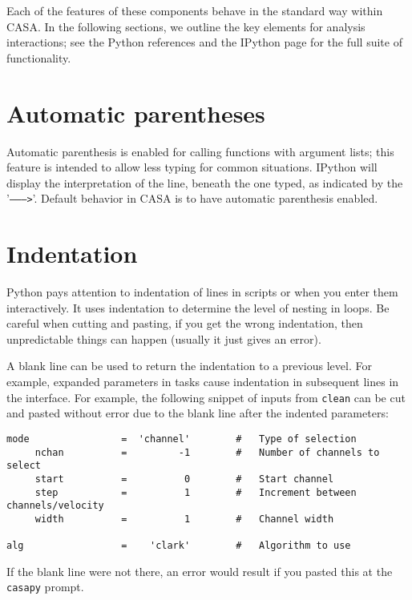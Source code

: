 Each of the features of these components behave in the standard way
within CASA. In the following sections, we outline the key elements
for analysis interactions; see the Python references and the
IPython page for the full suite of functionality.

\section{Automatic parentheses}
\label{section:python.par}

Automatic parenthesis is enabled for calling functions with argument
lists; this feature is intended to allow less typing for common
situations. IPython will display the interpretation of the line,
beneath the one typed, as indicated by the '{\tt -------->}'. Default
behavior in CASA is to have automatic parenthesis enabled. 

\section{Indentation}
\label{section:python.indent}

Python pays attention to indentation of lines in scripts or when you
enter them interactively.  It uses indentation to determine the level
of nesting in loops.  Be careful when cutting and pasting, if you
get the wrong indentation, then unpredictable things can happen
(usually it just gives an error).  

A blank line can be used to return the indentation to a previous
level.  For example, expanded parameters in tasks cause indentation
in subsequent lines in the interface.  For example, the following
snippet of inputs from {\tt clean} can be cut and pasted without 
error due to the blank line after the indented parameters:
\small
\begin{verbatim}
mode                =  'channel'        #   Type of selection
     nchan          =         -1        #   Number of channels to select 
     start          =          0        #   Start channel
     step           =          1        #   Increment between channels/velocity
     width          =          1        #   Channel width

alg                 =    'clark'        #   Algorithm to use
\end{verbatim}
\normalsize
If the blank line were not there, an error would result if you pasted
this at the {\tt casapy} prompt.

